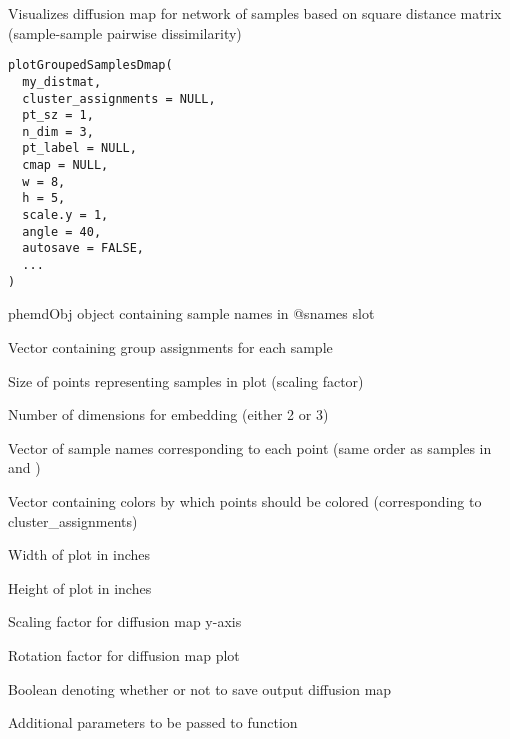 \documentclass[a4paper]{book}
\begin{document}
%
\begin{Description}\relax
Visualizes diffusion map for network of samples based on square distance matrix (sample-sample pairwise dissimilarity)
\end{Description}
%
\begin{Usage}
\begin{verbatim}
plotGroupedSamplesDmap(
  my_distmat,
  cluster_assignments = NULL,
  pt_sz = 1,
  n_dim = 3,
  pt_label = NULL,
  cmap = NULL,
  w = 8,
  h = 5,
  scale.y = 1,
  angle = 40,
  autosave = FALSE,
  ...
)
\end{verbatim}
\end{Usage}
%
\begin{Arguments}
\begin{ldescription}
\item[\code{my\_distmat}] phemdObj object containing sample names in @snames slot

\item[\code{cluster\_assignments}] Vector containing group assignments for each sample

\item[\code{pt\_sz}] Size of points representing samples in plot (scaling factor)

\item[\code{n\_dim}] Number of dimensions for embedding (either 2 or 3)

\item[\code{pt\_label}] Vector of sample names corresponding to each point (same order as samples in  and )

\item[\code{cmap}] Vector containing colors by which points should be colored (corresponding to cluster\_assignments)

\item[\code{w}] Width of plot in inches

\item[\code{h}] Height of plot in inches

\item[\code{scale.y}] Scaling factor for diffusion map y-axis

\item[\code{angle}] Rotation factor for diffusion map plot

\item[\code{autosave}] Boolean denoting whether or not to save output diffusion map

\item[\code{...}] Additional parameters to be passed to  function
\end{ldescription}
\end{Arguments}
\end{document}
